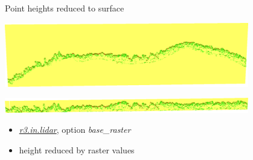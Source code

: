 \documentclass[xcolor={dvipsnames,usenames},beamer,aspectratio=169]{beamer}
\newcommand{\gmodule}[1]{\href{http://grass.osgeo.org/grass71/manuals/#1.html}{\emph{#1}}}
\begin{document}
\begin{frame}{Point heights reduced to surface}

\begin{center}
  \includegraphics[width=0.8\textwidth]{features/rast3_real}

  \bigskip

  \includegraphics[width=0.8\textwidth]{features/rast3_base}
\end{center}

\begin{itemize}
  \item \gmodule{r3.in.lidar}, option \textit{base\_raster}
  \item height reduced by raster values
\end{itemize}

\end{frame}
\end{document}
